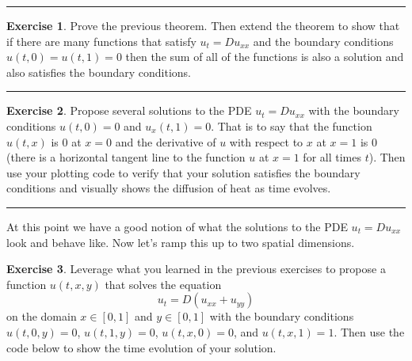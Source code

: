 \documentclass[
]{book}
\theoremstyle{definition}
\theoremstyle{definition}
\theoremstyle{definition}
\newtheorem{exercise}{Exercise}[chapter]
\theoremstyle{remark}
\begin{document}
\begin{center}\rule{0.5\linewidth}{0.5pt}\end{center}

\begin{exercise}
\protect\hypertarget{exr:unnamed-chunk-527}{}{\label{exr:unnamed-chunk-527} }Prove the previous theorem. Then extend the theorem to show that if there are many functions that satisfy \(u_t = D u_{xx}\) and the boundary conditions \(u(t,0) = u(t,1) = 0\) then the sum of all of the functions is also a solution and also satisfies the boundary conditions.
\end{exercise}

\begin{center}\rule{0.5\linewidth}{0.5pt}\end{center}

\begin{exercise}
\protect\hypertarget{exr:unnamed-chunk-528}{}{\label{exr:unnamed-chunk-528} }Propose several solutions to the PDE \(u_t = D u_{xx}\) with the boundary conditions \(u(t,0) = 0\) and \(u_x(t,1) = 0\). That is to say that the function \(u(t,x)\) is \(0\) at \(x=0\) and the derivative of \(u\) with respect to \(x\) at \(x=1\) is 0 (there is a horizontal tangent line to the function \(u\) at \(x=1\) for all times \(t\)). Then use your plotting code to verify that your solution satisfies the boundary conditions and visually shows the diffusion of heat as time evolves.
\end{exercise}

\begin{center}\rule{0.5\linewidth}{0.5pt}\end{center}

At this point we have a good notion of what the solutions to the PDE \(u_t = D u_{xx}\) look and behave like. Now let's ramp this up to two spatial dimensions.

\begin{exercise}
\protect\hypertarget{exr:unnamed-chunk-529}{}{\label{exr:unnamed-chunk-529} }Leverage what you learned in the previous exercises to propose a function \(u(t,x,y)\) that solves the equation
\[ u_t = D \left( u_{xx} + u_{yy} \right) \]
on the domain \(x \in [0,1]\) and \(y \in [0,1]\) with the boundary conditions \(u(t,0,y) = 0\), \(u(t,1,y) = 0\), \(u(t,x,0)=0\), and \(u(t,x,1)=1\). Then use the code below to show the time evolution of your solution.
\end{exercise}
\end{document}
